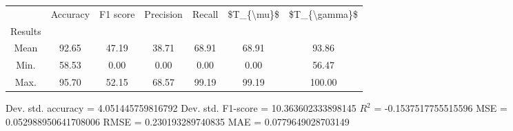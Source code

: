 \begin{tabular}{|c|c|c|c|c|c|c|}
\toprule
{} &  Accuracy &  F1 score &  Precision &  Recall &  \$T\_\{\textbackslash mu\}\$ &  \$T\_\{\textbackslash gamma\}\$ \\
Results &           &           &            &         &            &               \\
\hline
Mean    &     92.65 &     47.19 &      38.71 &   68.91 &      68.91 &         93.86 \\
Min.    &     58.53 &      0.00 &       0.00 &    0.00 &       0.00 &         56.47 \\
Max.    &     95.70 &     52.15 &      68.57 &   99.19 &      99.19 &        100.00 \\
\bottomrule
\end{tabular}

 Dev. std. accuracy = 4.051445759816792
 Dev. std. F1-score = 10.363602333898145
 $R^2$ = -0.1537517755515596
 MSE = 0.052988950641708006
 RMSE = 0.230193289740835
 MAE = 0.0779649028703149
